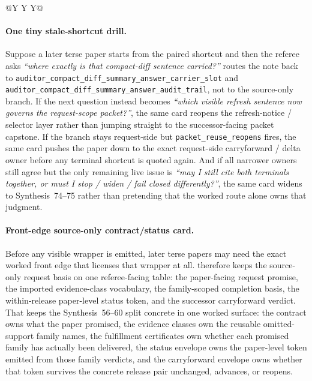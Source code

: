 \documentclass[11pt]{article}
\begin{document}
\begin{table}[t]
\begin{tabularx}{\linewidth}{@{}Y Y Y@{}}
\bottomrule
\end{tabularx}
\caption{Worked stale-shortcut routing card. This is the smallest worked map from one stale compact citation packet to the first narrower or wider owner that regains authority.}
\label{tab:workedexample-first-reopen-owner-card}
\end{table}

\paragraph{One tiny stale-shortcut drill.}
Suppose a later terse paper starts from the paired shortcut and then the referee asks \emph{``where exactly is that compact-diff sentence carried?''}
 routes the note back to \texttt{auditor\_compact\_diff\_summary\_answer\_carrier\_slot} and \texttt{auditor\_compact\_diff\_summary\_answer\_audit\_trail}, not to the source-only branch.
If the next question instead becomes \emph{``which visible refresh sentence now governs the request-scope packet?''}, the same card reopens the refresh-notice / selector layer rather than jumping straight to the successor-facing packet capstone.
If the branch stays request-side but \nolinkurl{packet\_reuse\_reopens} fires, the same card pushes the paper down to the exact request-side carryforward / delta owner before any terminal shortcut is quoted again.
And if all narrower owners still agree but the only remaining live issue is \emph{``may I still cite both terminals together, or must I stop / widen / fail closed differently?''}, the same card widens to Synthesis~74--75 rather than pretending that the worked route alone owns that judgment.

\paragraph{Front-edge source-only contract/status card.}
Before any visible wrapper is emitted, later terse papers may need the exact worked front edge that licenses that wrapper at all.
 therefore keeps the source-only request basis on one referee-facing table: the paper-facing request promise, the imported evidence-class vocabulary, the family-scoped completion basis, the within-release paper-level status token, and the successor carryforward verdict.
That keeps the Synthesis~56--60 split concrete in one worked surface: the contract owns what the paper promised, the evidence classes own the reusable omitted-support family names, the fulfillment certificates own whether each promised family has actually been delivered, the status envelope owns the paper-level token emitted from those family verdicts, and the carryforward envelope owns whether that token survives the concrete release pair unchanged, advances, or reopens.\cite{series:publicrequestcontracts,series:requestableevidenceclasses,series:requestfulfillmentcertificates,series:publicrequeststatusenvelopes,series:publicrequestcarryforward}
\end{document}
